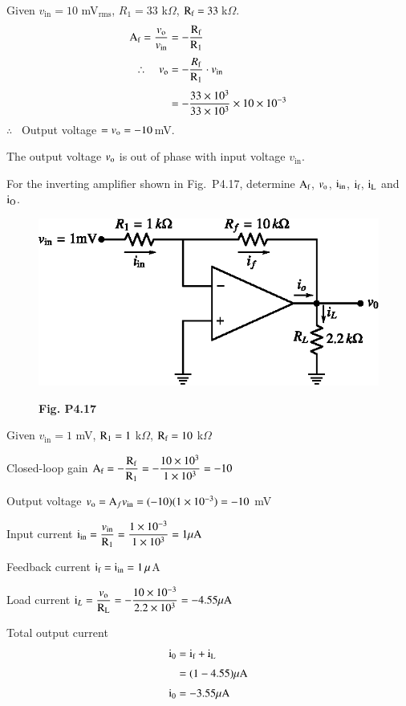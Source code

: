 \begin{solution}
Given $v_{\text{in}}=10$ mV$_{\text{rms}}$, $R_{1}=33$ k$\Omega$, $\textrm{R}_{\textrm{f}}=33$\,k$\Omega$.
\begin{align*}
\textrm{A}_{\textrm{f}} = \frac{v_{\textrm{o}}}{v_{\text{in}}} &= -\frac{\textrm{R}_{\textrm{f}}}{\textrm{R}_{1}}\\[3pt]
\therefore\quad v_{\textrm{o}} &= -\frac{R_{\textrm{f}}}{\textrm{R}_{1}}\cdot v_{\text{in}}\\[3pt]
&= -\frac{33\times 10^{3}}{33\times 10^{3}}\times 10\times 10^{-3}
\end{align*}
$\therefore$~ Output voltage $=v_{\textrm{o}}=-10$\,mV.

\smallskip
The output voltage $v_{\textrm{o}}$ is out of phase with input voltage $v_{\text{in}}$.
\end{solution}

\begin{problem}\label{prob4.17}
For the inverting amplifier shown in Fig.~P4.17, determine $\textrm{A}_{\textrm{f}}$, $v_{\textrm{o}}$, $\textrm{i}_{\text{in}}$, $\textrm{i}_{\textrm{f}}$, $\textrm{i}_{\textrm{L}}$ and $\textrm{i}_{\textrm{O}}$.
\begin{figure}[H]
\centering
\includegraphics{chap4/figP4.17.eps}

\smallskip
{\bf Fig. P4.17}
\end{figure}
\end{problem}

\begin{solution}
Given $v_{\text{in}}=1$ mV, $\textrm{R}_{1}=1$ k$\Omega$, $\textrm{R}_{\textrm{f}}=10$ k$\Omega$

\medskip
Closed-loop gain $\textrm{A}_{\textrm{f}}=-\dfrac{\textrm{R}_{\textrm{f}}}{\textrm{R}_{1}}=-\dfrac{10\times 10^{3}}{1\times 10^{3}}=-10$

\medskip
Output voltage $v_{\textrm{o}}=\textrm{A}_{f}v_{\text{in}}=(-10)(1\times 10^{-3})=-10$ mV

\medskip
Input current $\textrm{i}_{\text{in}}=\dfrac{v_{\text{in}}}{\textrm{R}_{1}}=\dfrac{1\times 10^{-3}}{1\times 10^{3}}=1\mu\textrm{A}$

\medskip
Feedback current $\textrm{i}_{\textrm{f}}=\textrm{i}_{\text{in}}=1\,\mu$A

\medskip
Load current $\textrm{i}_{L}=\dfrac{v_{\textrm{o}}}{\textrm{R}_{\textrm{L}}}=-\dfrac{10\times 10^{-3}}{2.2\times 10^{3}}=-4.55\mu\textrm{A}$

\eject

Total output current
\begin{align*}
\textrm{i}_{0} &= \textrm{i}_{\textrm{f}}+\textrm{i}_{\textrm{L}}\\[3pt]
&= (1-4.55)\mu\textrm{A}\\[3pt]
\textrm{i}_{0} &= -3.55\mu\textrm{A}
\end{align*}
\end{solution}

